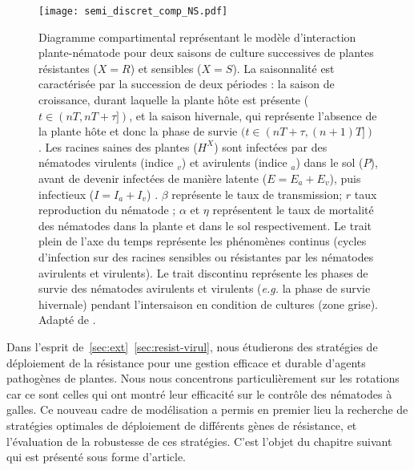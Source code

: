 	\begin{figure}	
		\centering \texttt{[image: semi\_discret\_comp\_NS.pdf]}
		\caption[Diagramme compartimental de  la dynamique saisonnière de l'infection d'une plante sensible ($X = S$) 
		ou résistante ($ X=R $) par des nématodes avirulents et virulents.]{
		Diagramme compartimental représentant le modèle d'interaction plante-nématode
		pour deux saisons de culture successives de plantes résistantes ($X = R$) et sensibles ($X = S$). La 
		saisonnalité est caractérisée par  la succession de deux périodes : la saison de croissance, durant laquelle la 
		plante hôte est présente ($t \in (nT, nT + \tau])$, et la saison hivernale, qui représente l'absence de la 
		plante hôte et donc la phase de survie $(t \in (nT + \tau, (n + 1)T])$. Les racines saines des plantes ($H^X$) 
		sont infectées par des nématodes virulents (indice $_v$) et avirulents (indice $_a$) dans le sol ($P$), avant 
		de devenir infectées de manière latente ($E = E_a + E_v $), puis infectieux ($I = I_a + I_v$) .  $\beta$ 
		représente le taux de  transmission; $r $ taux   reproduction du nématode ;  $\alpha$ et $\eta$ représentent le 
		taux de mortalité des nématodes dans la plante et dans le sol respectivement.  
		Le trait plein de l’axe du temps représente les phénomènes continus (cycles d’infection sur des racines 
		sensibles ou résistantes par les nématodes avirulents et virulents). Le trait discontinu représente les phases 
		de survie des nématodes avirulents et virulents (\textit{e.g.} la phase de survie hivernale) pendant 
		l’intersaison en condition de cultures (zone grise). Adapté de \citet{Mailleret2012}.}	
		\label{semi:discrete_complet_nilusmas}
	\end{figure}

	
	
	 Dans l'esprit de~\ref{sec:ext}~\autoref{sec:resist-virul}, nous étudierons des stratégies de déploiement de la résistance pour une gestion efficace et durable d'agents pathogènes de plantes. Nous nous concentrons particulièrement sur les rotations car ce sont celles qui ont montré leur efficacité sur le contrôle des nématodes à galles.  Ce nouveau cadre de modélisation a  permis en premier lieu la recherche de stratégies optimales de déploiement de différents  gènes de résistance, et l'évaluation de la robustesse de ces stratégies. C'est l'objet du chapitre suivant qui est présenté sous forme d'article.
	
	
	
	
	
	
